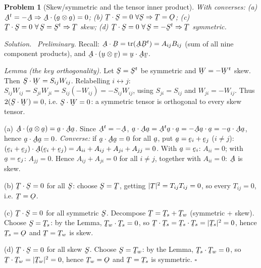 \documentclass[17pt,a4paper]{extreport}
\DeclareRobustCommand{\vek}[1]{\underaccent{\tilde}{#1}}
\newcommand{\tr}{\operatorname{tr}}
\newcommand{\Ob}{\vek{O}}
\newcommand{\ba}{\vek{a}}
\newcommand{\bu}{\vek{u}}
\newcommand{\bv}{\vek{v}}
\newcommand{\be}{\vek{e}}
\newcommand{\bA}{\vek{A}}
\newcommand{\bB}{\vek{B}}
\newcommand{\bS}{\vek{S}}
\newcommand{\bT}{\vek{T}}
\newcommand{\bW}{\vek{W}}
\newcommand{\ip}[2]{#1\cdot#2}
\theoremstyle{scplain}
\theoremstyle{scdefn}
\theoremstyle{scplain}
\newtheorem{problem}{Problem}
\newenvironment{solution}
 {\par\smallskip\noindent\textit{Solution.}\ }
 {\hfill$\square$\par\medskip}
\begin{document}
\begin{problem}[Skew/symmetric and the tensor inner product]
With converses: (a) $\bA^{t}=-\bA\Rightarrow\bA\cdot(\ba\otimes\ba)=0$;
(b) $\bT\cdot\bS=0\ \forall\bS\Rightarrow\bT=\Ob$;
(c) $\bT\cdot\bS=0\ \forall\,\bS=\bS^t\Rightarrow\bT$ skew;
(d) $\bT\cdot\bS=0\ \forall\,\bS=-\bS^t\Rightarrow\bT$ symmetric.
\end{problem}
\begin{solution}
\emph{Preliminary.} Recall: $\bA\cdot\bB=\tr(\bA\bB^t)=A_{ij}B_{ij}$
(sum of all nine component products), and
$\bA\cdot(\bu\otimes\bv)=\ip\bu{\bA\bv}$.

\emph{Lemma (the key orthogonality).}
Let $\bS=\bS^t$ be symmetric and $\bW=-\bW^t$ skew. Then
$\bS\cdot\bW=S_{ij}W_{ij}$. Relabelling $i\leftrightarrow j$:
$S_{ij}W_{ij}=S_{ji}W_{ji}=S_{ij}(-W_{ij})=-S_{ij}W_{ij}$, using
$S_{ji}=S_{ij}$ and $W_{ji}=-W_{ij}$. Thus $2(\bS\cdot\bW)=0$, i.e.
$\bS\cdot\bW=0$: a symmetric tensor is orthogonal to every skew tensor.

(a) $\bA\cdot(\ba\otimes\ba)=\ip\ba{\bA\ba}$. Since $\bA^t=-\bA$,
$\ip\ba{\bA\ba}=\ip{\bA^t\ba}\ba=\ip{-\bA\ba}\ba=-\ip\ba{\bA\ba}$,
hence $\ip\ba{\bA\ba}=0$. \emph{Converse:} if
$\ip\ba{\bA\ba}=0$ for all $\ba$, put $\ba=\be_i+\be_j$ ($i\neq j$):
$\ip{(\be_i+\be_j)}{\bA(\be_i+\be_j)}=A_{ii}+A_{ij}+A_{ji}+A_{jj}=0$.
With $\ba=\be_i$: $A_{ii}=0$; with $\ba=\be_j$: $A_{jj}=0$. Hence
$A_{ij}+A_{ji}=0$ for all $i\neq j$, together with $A_{ii}=0$: $\bA$ is
skew.

(b) $\bT\cdot\bS=0$ for all $\bS$: choose $\bS=\bT$, getting
$|\bT|^2=T_{ij}T_{ij}=0$, so every $T_{ij}=0$, i.e. $\bT=\Ob$.

(c) $\bT\cdot\bS=0$ for all symmetric $\bS$. Decompose
$\bT=\bT_s+\bT_w$ (symmetric + skew). Choose $\bS=\bT_s$: by the Lemma,
$\bT_w\cdot\bT_s=0$, so $\bT\cdot\bT_s=\bT_s\cdot\bT_s=|\bT_s|^2=0$,
hence $\bT_s=\Ob$ and $\bT=\bT_w$ is skew.

(d) $\bT\cdot\bS=0$ for all skew $\bS$. Choose $\bS=\bT_w$: by the Lemma,
$\bT_s\cdot\bT_w=0$, so $\bT\cdot\bT_w=|\bT_w|^2=0$, hence $\bT_w=\Ob$
and $\bT=\bT_s$ is symmetric.
\end{solution}
\end{document}
